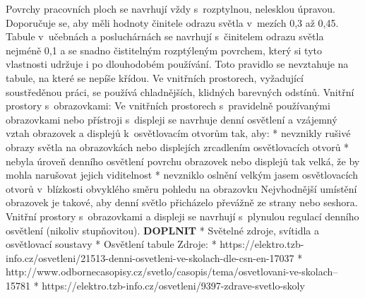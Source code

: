 Povrchy pracovních ploch se navrhují vždy s~rozptylnou, nelesklou úpravou. Doporučuje se, aby měli hodnoty
činitele odrazu světla v~mezích 0,3 až 0,45.
\medskip
Tabule v~učebnách a posluchárnách se navrhují s~činitelem odrazu světla nejméně 0,1 a se snadno čistitelným
rozptýleným povrchem, který si tyto vlastnosti udržuje i po dlouhodobém používání.
Toto pravidlo se nevztahuje na tabule, na které se nepíše křídou.
\medskip
Ve vnitřních prostorech, vyžadující soustředěnou práci, se používá chladnějších, klidných barevných odstínů.
\medskip
Vnitřní prostory s~obrazovkami:
\medskip
Ve vnitřních prostorech s~pravidelně používanými obrazovkami nebo přístroji s~displeji se navrhuje denní
osvětlení a vzájemný vztah obrazovek a displejů k~osvětlovacím otvorům tak, aby:
\medskip
\begitems
    * nevznikly rušivé obrazy světla na obrazovkách nebo displejích zrcadlením osvětlovacích otvorů
    * nebyla úroveň denního osvětlení povrchu obrazovek nebo displejů tak velká, že by mohla narušovat jejich viditelnost
    * nevzniklo oslnění velkým jasem osvětlovacích otvorů v~blízkosti obvyklého směru pohledu na obrazovku
\enditems
\medskip
Nejvhodnější umístění obrazovek je takové, aby denní světlo přicházelo převážně ze strany nebo seshora.
\medskip
Vnitřní prostory s~obrazovkami a displeji se navrhují s~plynulou regulací denního osvětlení (nikoliv stupňovitou).
\medskip
{\bf DOPLNIT}
\begitems
* Světelné zdroje, svítidla a osvětlovací soustavy
* Osvětlení tabule
\enditems
\medskip
{\sbf Zdroje:}
\begitems
* https://elektro.tzb-info.cz/osvetleni/21513-denni-osvetleni-ve-skolach-dle-csn-en-17037
* http://www.odbornecasopisy.cz/svetlo/casopis/tema/osvetlovani-ve-skolach--15781
* https://elektro.tzb-info.cz/osvetleni/9397-zdrave-svetlo-skoly
\enditems





